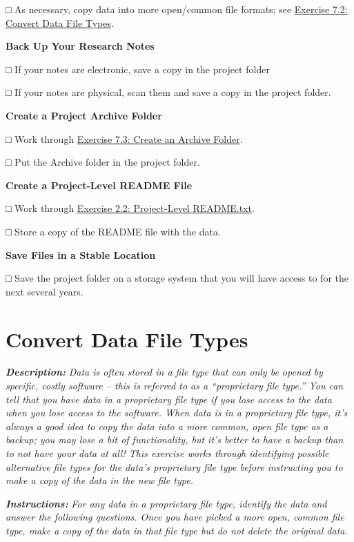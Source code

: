 \documentclass[
]{book}
\begin{document}
□ As necessary, copy data into more open/common file formats; see \protect\hyperlink{file-type}{Exercise 7.2: Convert Data File Types}.

\textbf{Back Up Your Research Notes}

□ If your notes are electronic, save a copy in the project folder

□ If your notes are physical, scan them and save a copy in the project folder.

\textbf{Create a Project Archive Folder}

□ Work through \protect\hyperlink{archive-folder}{Exercise 7.3: Create an Archive Folder}.

□ Put the Archive folder in the project folder.

\textbf{Create a Project-Level README File}

□ Work through \protect\hyperlink{readme-txt}{Exercise 2.2: Project-Level README.txt}.

□ Store a copy of the README file with the data.

\textbf{Save Files in a Stable Location}

□ Save the project folder on a storage system that you will have access to for the next several years.

\hypertarget{file-type}{%
\section{Convert Data File Types}\label{file-type}}

\textbf{\emph{Description:}} \emph{Data is often stored in a file type that can only be opened by specific, costly software -- this is referred to as a ``proprietary file type.'' You can tell that you have data in a proprietary file type if you lose access to the data when you lose access to the software. When data is in a proprietary file type, it's always a good idea to copy the data into a more common, open file type as a backup; you may lose a bit of functionality, but it's better to have a backup than to not have your data at all! This exercise works through identifying possible alternative file types for the data's proprietary file type before instructing you to make a copy of the data in the new file type.}

\textbf{\emph{Instructions:}} \emph{For any data in a proprietary file type, identify the data and answer the following questions. Once you have picked a more open, common file type, make a copy of the data in that file type but do not delete the original data.}
\end{document}
